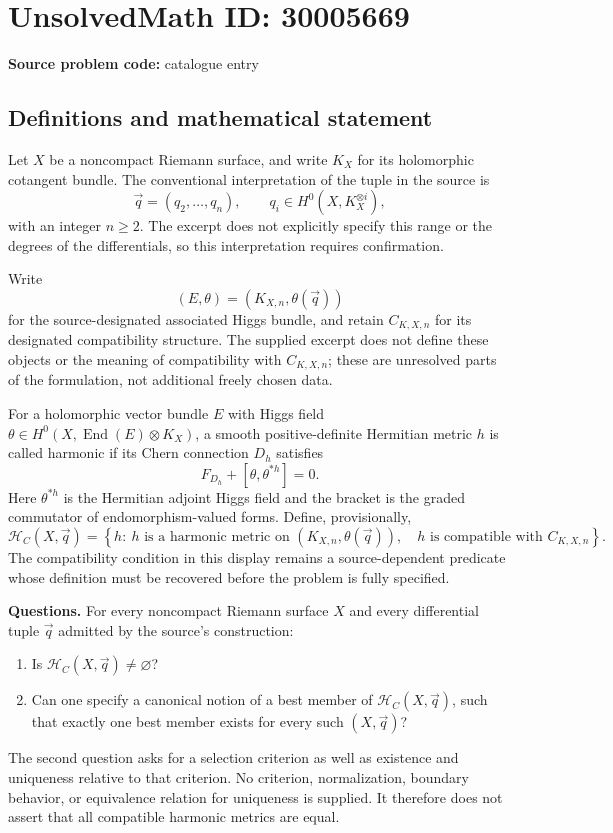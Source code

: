 \documentclass[11pt]{article}
\begin{document}
\section*{UnsolvedMath ID: 30005669}
\textbf{Source problem code:} catalogue entry
\subsection{Definitions and mathematical statement}
Let \(X\) be a noncompact Riemann surface, and write \(K_X\) for its holomorphic cotangent bundle. The conventional interpretation of the tuple in the source is
\[
\vec q=(q_2,\ldots,q_n),\qquad q_i\in H^0(X,K_X^{\otimes i}),
\]
with an integer \(n\geq2\). The excerpt does not explicitly specify this range or the degrees of the differentials, so this interpretation requires confirmation.

Write
\[
(E,\theta)=(K_{X,n},\theta(\vec q))
\]
for the source-designated associated Higgs bundle, and retain \(C_{K,X,n}\) for its designated compatibility structure. The supplied excerpt does not define these objects or the meaning of compatibility with \(C_{K,X,n}\); these are unresolved parts of the formulation, not additional freely chosen data.

For a holomorphic vector bundle \(E\) with Higgs field \(\theta\in H^0(X,\operatorname{End}(E)\otimes K_X)\), a smooth positive-definite Hermitian metric \(h\) is called harmonic if its Chern connection \(D_h\) satisfies
\[
F_{D_h}+[\theta,\theta^{*h}]=0.
\]
Here \(\theta^{*h}\) is the Hermitian adjoint Higgs field and the bracket is the graded commutator of endomorphism-valued forms. Define, provisionally,
\[
\mathcal H_C(X,\vec q)=\left\{h:\ h\text{ is a harmonic metric on }(K_{X,n},\theta(\vec q)),\quad h\text{ is compatible with }C_{K,X,n}\right\}.
\]
The compatibility condition in this display remains a source-dependent predicate whose definition must be recovered before the problem is fully specified.

\textbf{Questions.} For every noncompact Riemann surface \(X\) and every differential tuple \(\vec q\) admitted by the source's construction:
\begin{enumerate}
\item Is \(\mathcal H_C(X,\vec q)\neq\varnothing\)?
\item Can one specify a canonical notion of a best member of \(\mathcal H_C(X,\vec q)\), such that exactly one best member exists for every such \((X,\vec q)\)?
\end{enumerate}
The second question asks for a selection criterion as well as existence and uniqueness relative to that criterion. No criterion, normalization, boundary behavior, or equivalence relation for uniqueness is supplied. It therefore does not assert that all compatible harmonic metrics are equal.
\end{document}
